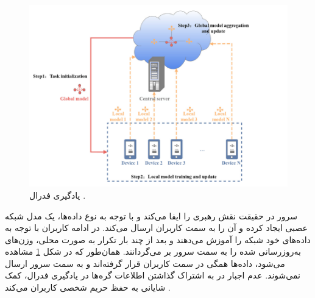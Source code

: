  \begin{figure}[t]
	\centering
	\includegraphics[scale=0.7]{images/chap1/federated_learning.png}%
	\caption{%
		یادگیری فدرال 
		\cite{ma2022state}%
		.
	}
	\label{federated_learning}
	\centering
\end{figure}

سرور در حقیقت نقش رهبری را ایفا می‌کند و با توجه به نوع داده‌ها، یک مدل شبکه عصبی%
ایجاد کرده و آن را به سمت کاربران ارسال می‌کند. در ادامه کاربران با توجه به داده‌های خود شبکه را آموزش می‌دهند و بعد از چند بار تکرار به صورت محلی، وزن‌های به‌روزرسانی شده را به سمت سرور بر می‌گردانند. همان‌طور که در شکل
\ref{federated_learning}
مشاهده می‌شود، داده‌ها همگی در سمت کاربران قرار گرفته‌اند و به سمت سرور ارسال نمی‌شوند. عدم اجبار در به اشتراک گذاشتن اطلاعات گره‌ها در یادگیری فدرال، کمک شایانی به حفظ حریم شخصی کاربران می‌کند
\cite{smith2017federated}.








